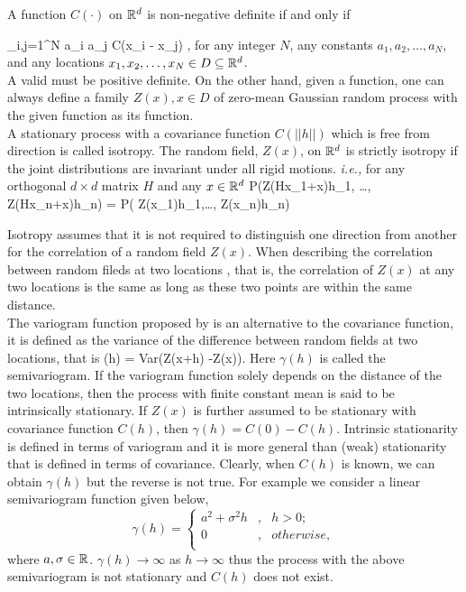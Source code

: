 A function $C(\cdot)$ on $\mathbb{R}^d$ is non-negative definite if and only if

\beq
\label{cov_pd}
\sum_{i,j=1}^{N} a_i a_j C(x_i - x_j) ,
\eeq
for any integer $N$, any constants $a_1, a_2, \ldots, a_N$, and any locations $x_1, x_2, \ldots, x_N \in D \subseteq \mathbb{R}^d$.\\ 

A valid \cov must be positive definite. On the other hand, given a \pd function, one can always define a family $Z(x), x \in D$ of zero-mean Gaussian random process with the given function as its \cov function.\\

A stationary process with a covariance function $C(||h||)$ which is free from direction is called isotropy. The random field, $Z(x)$, on $\mathbb{R}^d$ is strictly isotropy if the joint distributions are invariant under all rigid motions. {\em i.e.,} for any orthogonal $d\times d$ matrix $H$ and any $x\in \mathbb{R}^d$
\beq
P(Z(Hx_1+x)\le h_1, \ldots, Z(Hx_n+x)\le h_n) = P( Z(x_1)\le h_1,\ldots, Z(x_n)\le h_n)
\eeq

Isotropy assumes that it is not required to distinguish one direction from another for the correlation of a random field $Z(x)$. When describing the correlation between random fileds at two locations , that is, the correlation of $Z(x)$ at any two locations is the same as long as these two points are within the same distance.\\

The variogram function proposed by \cite{Matheron1973} is an alternative to the covariance function, it is defined as the variance of the difference between random fields at two locations, that is
\gamma(h) = Var(Z(x+h) -Z(x)).
\eeq
Here $\gamma(h)$ is called the semivariogram. If the variogram function solely depends on the distance of the two locations, then the process with finite constant mean is said to be intrinsically stationary. If $Z(x)$ is further assumed to be stationary with covariance function $C(h)$, then $\gamma(h) = C(0) - C(h)$. Intrinsic stationarity is defined in terms of variogram and it is more general than (weak) stationarity that is defined in terms of covariance. Clearly, when $C(h)$ is known, we can obtain $\gamma(h)$ but the reverse is not true. For example we consider a linear semivariogram function given below,
\[
	\gamma(h) = \left \{ \begin{array}{cll}
	a^2+\sigma^2h &, & h>0 ; \\
	0 &, & otherwise,  \\
	\end{array}
	\right.
\]
where $a,\sigma \in \mathbb{R}$. $\gamma(h) \to \infty$ as $h \to \infty$ thus the process with the above semivariogram is not stationary and $C(h)$ does not exist. \\

